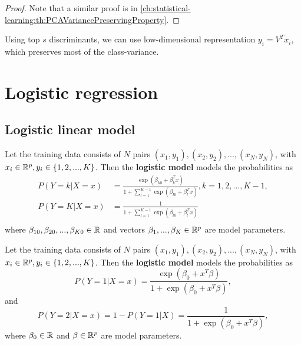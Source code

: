 \begin{refsection}
\begin{proof}
Note that a similar proof is in \autoref{ch:statistical-learning:th:PCAVariancePreservingProperty}. 
\end{proof}


\begin{remark}
Using top $s$ discriminants, we can use low-dimensional representation $y_i = V^Tx_i$, which preserves most of the class-variance.
\end{remark}

\section{Logistic regression}


\subsection{Logistic linear model}


\begin{definition}
	Let the training data consists of $N$ pairs $(x_1,y_1),(x_2,y_2),...,(x_N,y_N)$, with $x_i \in \mathbb{R}^{p}, y_i \in \{1,2,...,K\}$. Then the \textbf{logistic model} models the probabilities as
	\begin{align*}
	P(Y = k|X=x) &= \frac{\exp(\beta_{k0} + \beta_k^Tx)}{1 + \sum_{l=1}^{K-1}\exp(\beta_{l0}+\beta_l^Tx)}, k=1,2,...,K-1, \\
	P(Y = K|X=x) &= \frac{1}{1 + \sum_{l=1}^{K-1}\exp(\beta_{l0}+\beta_l^Tx)} \\
	\end{align*}
	where $\beta_{10},\beta_{20},...,\beta_{K0} \in \mathbb{R}$ and vectors $\beta_1,...,\beta_K\in\mathbb{R}^p$ are model parameters.
\end{definition}


\begin{definition}
	Let the training data consists of $N$ pairs $(x_1,y_1),(x_2,y_2),...,(x_N,y_N)$, with $x_i \in \mathbb{R}^{p}, y_i \in \{1,2,...,K\}$. Then the \textbf{logistic model} models the probabilities as
	$$P(Y=1|X=x) = \frac{\exp(\beta_0 + x^T\beta)}{1 + \exp(\beta_0 + x^T\beta)},$$
	and
	$$P(Y=2|X=x) = 1- P(Y=1|X) = \frac{1}{1 + \exp(\beta_0 + x^T\beta)},$$ 
	where $\beta_0 \in \mathbb{R}$ and $\beta\in\mathbb{R}^p$ are model parameters.
\end{definition}



\end{refsection}
